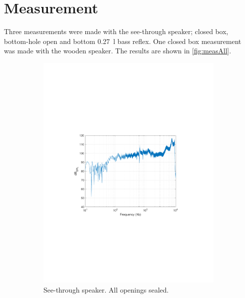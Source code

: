 
\section{Measurement}
Three measurements were made with the see-through speaker; closed box, bottom-hole open and bottom \SI{0.27}{\litre} bass reflex. One closed box measurement was made with the wooden speaker. The results are shown in \cref{fig:measAll}.

\begin{figure}
	\centering
	\begin{subfigure}{.5\textwidth}
		\centering
		\includegraphics[width=.9\linewidth, clip, trim={3.9cm 8.4cm 4.5cm 9cm}]{gfx/SpeakerMeas/PGclosed.pdf}
		\caption{See-through speaker. All openings sealed.}
		\label{fig:measPGclose}
	\end{subfigure}%
	\begin{subfigure}{.5\textwidth}
		\centering

\end{subfigure}
\end{figure}
